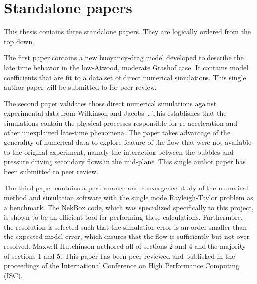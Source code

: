 \chapter{Standalone papers}

This thesis contains three standalone papers.
They are logically ordered from the top down.

The first paper contains a new buoyancy-drag model developed to describe the late time behavior in the low-Atwood, moderate Grashof case.
It contains model coefficients that are fit to a data set of direct numerical simulations.
This single author paper will be submitted to for peer review.

The second paper validates those direct numerical simulations against experimental data from Wilkinson and Jacobs~\cite{Wilkinson2007}.
This establishes that the simulations contain the physical processes responsible for re-acceleration and other unexplained late-time phenomena.
The paper takes advantage of the generality of numerical data to explore feature of the flow that were not available to the original experiment, namely the interaction between the bubbles and pressure driving secondary flows in the mid-plane.
This single author paper has been submitted to peer review.

The third paper contains a performance and convergence study of the numerical method and simulation software with the single mode Rayleigh-Taylor problem as a benchmark.
The NekBox code, which was specialized specifically to this project, is shown to be an efficient tool for performing these calculations.
Furthermore, the resolution is selected such that the simulation error is an order smaller than the expected model error, which ensures that the flow is sufficiently but not over resolved.
Maxwell Hutchinson authored all of sections 2 and 4 and the majority of sections 1 and 5.
This paper has been peer reviewed and published in the proceedings of the International Conference on High Performance Computing (ISC).

